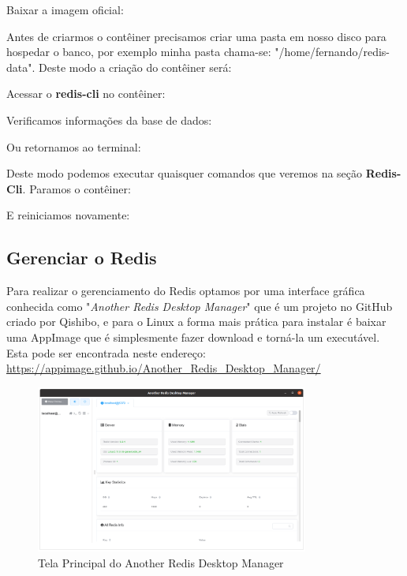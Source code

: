 \documentclass[a4paper,11pt]{article}
\begin{document}
Baixar a imagem oficial: \\

Antes de criarmos o contêiner precisamos criar uma pasta em nosso disco para hospedar o banco, por exemplo minha pasta chama-se: "/home/fernando/redis-data". Deste modo a criação do contêiner será: \\

Acessar o \textbf{redis-cli} no contêiner: \\

Verificamos informações da base de dados: \\

Ou retornamos ao terminal: \\

Deste modo podemos executar quaisquer comandos que veremos na seção \textbf{Redis-Cli}. Paramos o contêiner: \\

E reiniciamos novamente: \\

\subsection{Gerenciar o Redis}
Para realizar o gerenciamento do Redis optamos por uma interface gráfica conhecida como "\textit{Another Redis Desktop Manager}"\cite{ardmoficial} que é um projeto no GitHub criado por Qishibo, e para o Linux a forma mais prática para instalar é baixar uma AppImage que é simplesmente fazer download e torná-la um executável. Esta pode ser encontrada neste endereço: \url{https://appimage.github.io/Another_Redis_Desktop_Manager/}
\begin{figure}[H]
	\centering
	\includegraphics[width=0.8\textwidth]{imagens/ARDM}
	\caption{Tela Principal do Another Redis Desktop Manager}
\end{figure}
\end{document}
